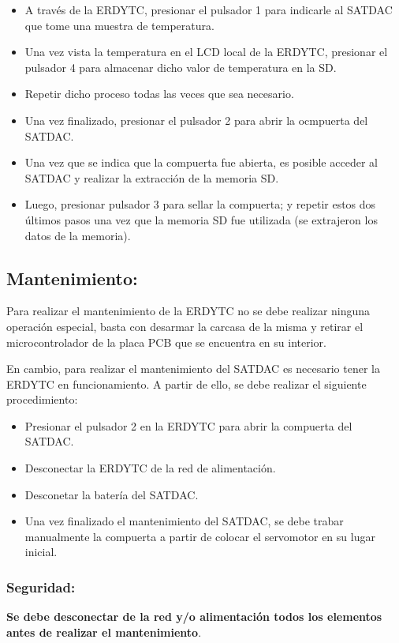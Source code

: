 \documentclass[conference]{IEEEtran}
\begin{document}
\begin{itemize}
\item A través de la ERDYTC, presionar el pulsador 1 para indicarle al SATDAC que tome una muestra de temperatura.
\item Una vez vista la temperatura en el LCD local de la ERDYTC, presionar el pulsador 4 para almacenar dicho valor de temperatura en la SD.
\item Repetir dicho proceso todas las veces que sea necesario.
\item Una vez finalizado, presionar el pulsador 2 para abrir la ocmpuerta del SATDAC.
\item Una vez que se indica que la compuerta fue abierta, es posible acceder al SATDAC y realizar la extracción de la memoria SD.
\item Luego, presionar pulsador 3 para sellar la compuerta; y repetir estos dos últimos pasos una vez que la memoria SD fue utilizada (se extrajeron los datos de la memoria).
\end{itemize}

\subsection{Mantenimiento:}
\label{sec:org9d62904}
Para realizar el mantenimiento de la ERDYTC no se debe realizar ninguna operación especial, basta con desarmar la carcasa de la misma y retirar el microcontrolador de la placa PCB que se encuentra en su interior.

En cambio, para realizar el mantenimiento del SATDAC es necesario tener la ERDYTC en funcionamiento. A partir de ello, se debe realizar el siguiente procedimiento:

\begin{itemize}
\item Presionar el pulsador 2 en la ERDYTC para abrir la compuerta del SATDAC.
\item Desconectar la ERDYTC de la red de alimentación.
\item Desconetar la batería del SATDAC.
\item Una vez finalizado el mantenimiento del SATDAC, se debe trabar manualmente la compuerta a partir de colocar el servomotor en su lugar inicial.
\end{itemize}
\subsubsection{Seguridad:}
\label{sec:org156444e}
\textbf{Se debe desconectar de la red y/o alimentación todos los elementos antes de realizar el mantenimiento}.
\end{document}
